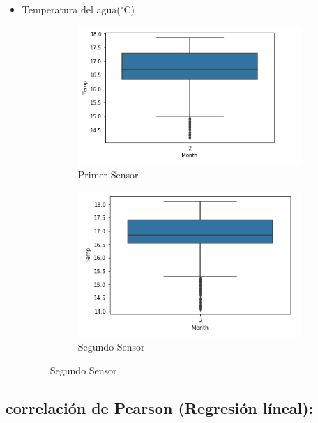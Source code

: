 \documentclass{article}
\begin{document}
\begin{itemize}
\item Temperatura del agua($^\circ$C)
\begin{figure}[h!]
	\begin{subfigure}[b]{0.5\linewidth}
    \raggedleft
	\includegraphics[width=\linewidth]{temp1st.png}
    \caption{Primer Sensor}
	\end{subfigure}
	\begin{subfigure}[b]{0.5\linewidth}
    \raggedright
	\includegraphics[width=\linewidth]{temp2nd.png}
	\caption{Segundo Sensor}
    \end{subfigure}
\end{figure}

\end{itemize}

\subsection{correlación de Pearson (Regresión líneal):}
\end{document}
